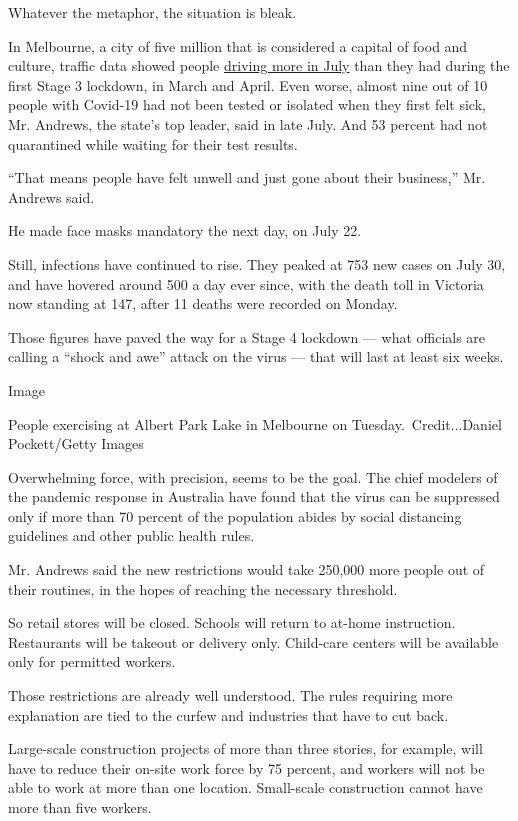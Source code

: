 Whatever the metaphor, the situation is bleak.

In Melbourne, a city of five million that is considered a capital of
food and culture, traffic data showed people
\href{https://www.theage.com.au/national/victoria/lockdown-2-0-traffic-worse-compared-with-april-but-less-than-pre-covid-20200801-p55hlq.html}{driving
more in July} than they had during the first Stage 3 lockdown, in March
and April. Even worse, almost nine out of 10 people with Covid-19 had
not been tested or isolated when they first felt sick, Mr. Andrews, the
state's top leader, said in late July. And 53 percent had not
quarantined while waiting for their test results.

``That means people have felt unwell and just gone about their
business,'' Mr. Andrews said.

He made face masks mandatory the next day, on July 22.

Still, infections have continued to rise. They peaked at 753 new cases
on July 30, and have hovered around 500 a day ever since, with the death
toll in Victoria now standing at 147, after 11 deaths were recorded on
Monday.

Those figures have paved the way for a Stage 4 lockdown --- what
officials are calling a ``shock and awe'' attack on the virus --- that
will last at least six weeks.

Image

People exercising at Albert Park Lake in Melbourne on
Tuesday.~Credit...Daniel Pockett/Getty Images

Overwhelming force, with precision, seems to be the goal. The chief
modelers of the pandemic response in Australia have found that the virus
can be suppressed only if more than 70 percent of the population abides
by social distancing guidelines and other public health rules.

Mr. Andrews said the new restrictions would take 250,000 more people out
of their routines, in the hopes of reaching the necessary threshold.

So retail stores will be closed. Schools will return to at-home
instruction. Restaurants will be takeout or delivery only. Child-care
centers will be available only for permitted workers.

Those restrictions are already well understood. The rules requiring more
explanation are tied to the curfew and industries that have to cut back.

Large-scale construction projects of more than three stories, for
example, will have to reduce their on-site work force by 75 percent, and
workers will not be able to work at more than one location. Small-scale
construction cannot have more than five workers.

